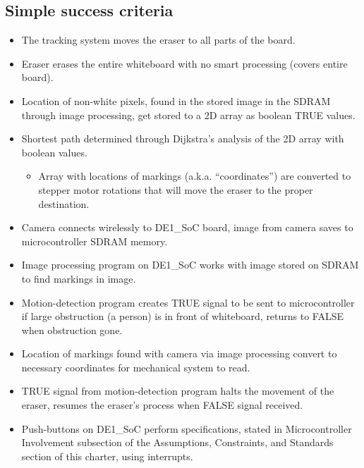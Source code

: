 \subsection{Simple success criteria}
\begin{itemize}
\item The tracking system moves the eraser to all parts of the board. 
\item Eraser erases the entire whiteboard with no smart processing (covers entire board).
\item Location of non-white pixels, found in the stored image in the SDRAM through image processing, get stored to a 2D array as boolean TRUE values.
\item Shortest path determined through Dijkstra's analysis of the 2D array with boolean values.
\begin{itemize}
	\item Array with locations of markings (a.k.a. ``coordinates'') are converted to stepper motor rotations that will move the eraser to the proper destination.
\end{itemize}
\item Camera connects wirelessly to DE1\_SoC board, image from camera saves to microcontroller SDRAM memory.
\item Image processing program on DE1\_SoC works with image stored on SDRAM to find markings in image.
\item Motion-detection program creates TRUE signal to be sent to microcontroller if large obstruction (a person) is in front of whiteboard, returns to FALSE when obstruction gone.
\item Location of markings found with camera via image processing convert to necessary coordinates for mechanical system to read.
\item TRUE signal from motion-detection program halts the movement of the eraser, resumes the eraser's process when FALSE signal received.
\item Push-buttons on DE1\_SoC perform specifications, stated in Microcontroller Involvement subsection of the Assumptions, Constraints, and Standards section of this charter, using interrupts. \\
\end{itemize}

